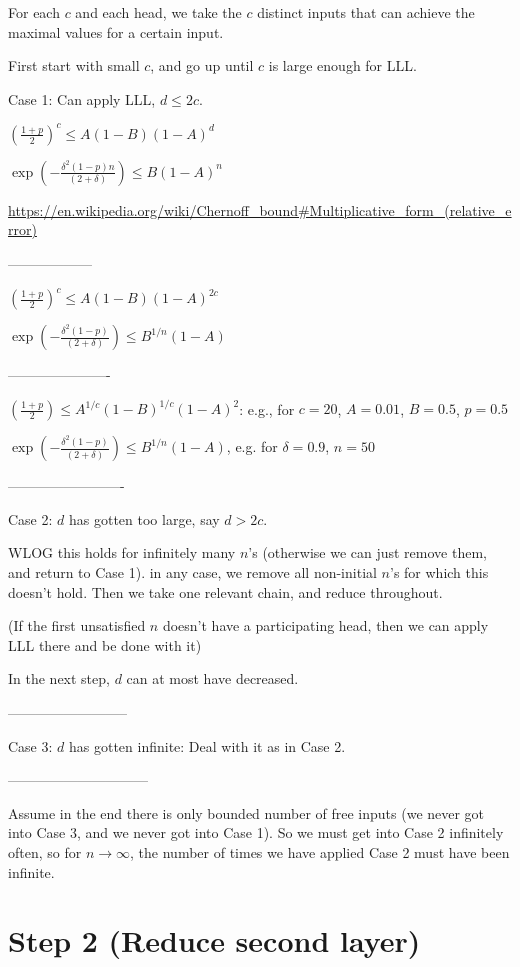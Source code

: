 \documentclass[11pt,a4paper]{article}
\begin{document}
For each $c$ and each head, we take the $c$ distinct inputs that can achieve the maximal values for a certain input.

First start with small $c$, and go up until $c$ is large enough for LLL.

Case 1: Can apply LLL, $d \leq 2c$.

$\left(\frac{1+p}{2}\right)^c \leq A (1-B) (1-A)^d$

$ \exp(-\frac{\delta^2(1-p)n}{(2+\delta)})  \leq B (1-A)^n$


\url{https://en.wikipedia.org/wiki/Chernoff_bound#Multiplicative_form_(relative_error)}

------------------

$\left(\frac{1+p}{2}\right)^c \leq A (1-B) (1-A)^{2c}$

$ \exp(-\frac{\delta^2(1-p)}{(2+\delta)})  \leq B^{1/n} (1-A)$


----------------------

$\left(\frac{1+p}{2}\right) \leq A^{1/c} (1-B)^{1/c} (1-A)^{2}$: e.g., for $c=20$, $A=0.01$, $B=0.5$, $p=0.5$

$ \exp(-\frac{\delta^2(1-p)}{(2+\delta)})  \leq B^{1/n} (1-A)$, e.g. for $\delta=0.9$, $n = 50$

-------------------------

Case 2: $d$ has gotten too large, say $d > 2c$.

WLOG this holds for infinitely many $n$'s (otherwise we can just remove them, and return to Case 1). in any case, we remove all non-initial $n$'s for which this doesn't hold.
Then we take one relevant chain, and reduce throughout.

(If the first unsatisfied $n$ doesn't have a participating head, then we can apply LLL there and be done with it)

In the next step, $d$ can at most have decreased.

--------------------------

Case 3: $d$ has gotten infinite: Deal with it as in Case 2.

------------------------------

Assume in the end there is only bounded number of free inputs (we never got into Case 3, and we never got into Case 1).
So we must get into Case 2 infinitely often, so for $n \rightarrow \infty$, the number of times we have applied Case 2 must have been infinite.



\section{Step 2 (Reduce second layer)}
\end{document}
